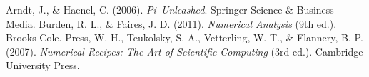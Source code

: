 \documentclass[conference]{IEEEtran}
\begin{document}
\begin{thebibliography}{00}
 Arndt, J., \& Haenel, C. (2006). \textit{Pi--Unleashed}. Springer Science \& Business Media.
 Burden, R. L., \& Faires, J. D. (2011). \textit{Numerical Analysis} (9th ed.). Brooks Cole.
 Press, W. H., Teukolsky, S. A., Vetterling, W. T., \& Flannery, B. P. (2007). \textit{Numerical Recipes: The Art of Scientific Computing} (3rd ed.). Cambridge University Press.
\end{thebibliography}
\end{document}
